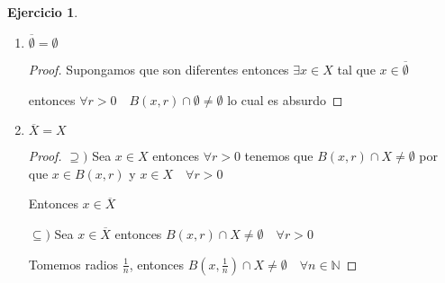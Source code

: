 \documentclass[11pt]{report}
\newcommand{\N}{\mathbb{N}}
\newcommand{\ol}{\overline}
\theoremstyle{definition}
\newtheorem{ej}{Ejercicio}
\begin{document}
\begin{ej}
\begin{enumerate}
\begin{enumerate}
\begin{proof}
	    Como $F = \ol F$ por ser cerrado, entonces $x \notin \ol F$ para algún $F$ en la intersección

	    Entonces $\exists r'>0$ tal que $B(x,r') \cap F = \emptyset$

	    Pero esto es absurdo dado que $A \subseteq F$ tenemos $\emptyset \neq B(x,r') \cap A \subseteq B(x,r') \cap F = \emptyset$

	    Provino de suponer que $x \notin F$ por lo tanto $x \in F $

	    Y esto vale para cualquier $F$ cerrado tal que $A \subseteq F$

	    Entonces $x$ esta en todos estos $F$ y por ende en la intersección

	$\supseteq )$ Supongamos que $x \in \bigcap F$ pero $x \notin \ol A$ entonces tiene que existir un $r>0$ tal que $B(x,r) \cap A = \emptyset$ luego tenemos que $A \subseteq X \setminus B(x,r)$ que ademas es cerrado por que es el complemento de $B(x,r)$ que es abierto

	Pero entonces $X \setminus B(x,r)$ es un cerrado que contiene a $A$ por ende es uno de los $F$ en la intersección

	Entonces $x \in X \setminus B(x,r)$ lo cual es absurdo

	Provino de suponer que existia un $r>0$ tal que $B(x,r) \cap A = \emptyset$

	Entonces $\forall r>0 \quad B(x,r) \cap A \neq \emptyset$ por lo tanto $x \in \ol A$
	  \end{proof}
	\item $\ol \emptyset = \emptyset$
	  \begin{proof}
	    Supongamos que son diferentes entonces $\exists x \in X$ tal que $x \in \ol \emptyset$

	    entonces $\forall r>0 \quad B(x,r) \cap \emptyset \neq \emptyset$ lo cual es absurdo
	  \end{proof}
	\item $\ol X = X$
	  \begin{proof}
		  $\supseteq )$ Sea $x \in X$ entonces $\forall r >0$ tenemos que $ B(x,r) \cap X \neq \emptyset$ por que $x \in B(x,r)$ y $x \in X \quad \forall r >0$

		  Entonces $x \in \ol X$

	$\subseteq ) $ Sea $x \in \ol X$ entonces $B(x,r) \cap X \neq \emptyset \quad \forall r>0$ 

	Tomemos radios $\frac{1}{n}$, entonces $B(x,\frac{1}{n}) \cap X \neq \emptyset \quad \forall n \in \N$


\end{proof}
\end{enumerate}
\end{enumerate}
\end{ej}
\end{document}
